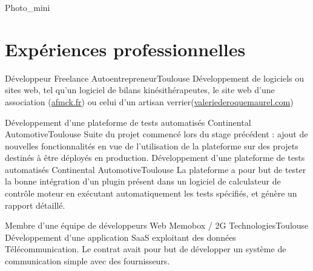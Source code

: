 \documentclass{my_cv_bis}
\begin{document}
 {
}{Photo_mini}

 \vspace{-5mm}
\section{Expériences professionnelles}
	{Développeur Freelance}
	{Autoentrepreneur}{Toulouse}
	{
	Développement de logiciels ou sites web, tel qu'un logiciel de bilans kinésithérapeutes, le site web d'une association (\url{afmck.fr})
	ou celui d'un artisan verrier(\url{valeriederoquemaurel.com})
	}
	{}

	{Développement d'une plateforme de tests automatisés}
	{Continental Automotive}{Toulouse}
	{
	Suite du projet commencé lors du stage précédent : ajout de nouvelles fonctionnalités en vue de l'utilisation
	de la plateforme sur des projets destinés à être déployés en production. 
	}
	{}
	{Développement d'une plateforme de tests automatisés}
	{Continental Automotive}{Toulouse}
	{
	La plateforme a pour but de tester la bonne intégration d'un plugin présent dans un logiciel de calculateur de contrôle moteur en exécutant
	automatiquement les tests spécifiés, et génère un rapport détaillé. 
	}
	{}

	{ Membre d'une équipe de développeurs Web}
	{Memobox / 2G Technologies}{Toulouse}
	{Développement d'une application SaaS exploitant des données Télécommunication. Le contrat avait pour but de développer un système de
	communication simple avec des fournisseurs.} {}
\end{document}
